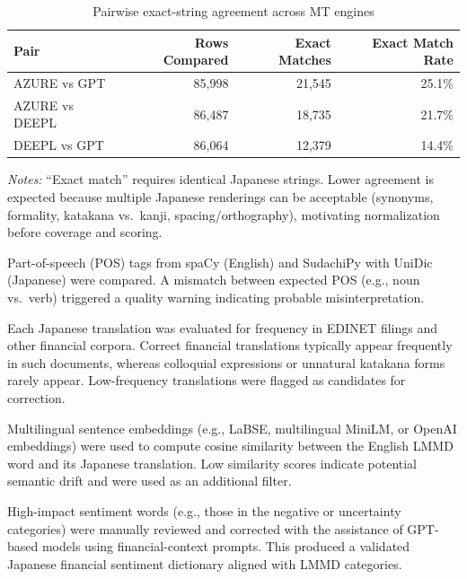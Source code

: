 \begin{table}[htbp]
\centering
\small
\caption{Pairwise exact-string agreement across MT engines}
\label{tab:lmmd_pairwise_agreement}
\begin{tabular}{lrrr}
\toprule
\textbf{Pair} & \textbf{Rows Compared} & \textbf{Exact Matches} & \textbf{Exact Match Rate} \\
\midrule
AZURE vs GPT   & 85,998 & 21,545 & 25.1\% \\
AZURE vs DEEPL & 86,487 & 18,735 & 21.7\% \\
DEEPL vs GPT   & 86,064 & 12,379 & 14.4\% \\
\bottomrule
\end{tabular}

\vspace{4pt}
\begin{minipage}{0.95\linewidth}
\footnotesize
\emph{Notes:} “Exact match” requires identical Japanese strings. Lower agreement is expected because multiple Japanese renderings can be acceptable (synonyms, formality, katakana vs.\ kanji, spacing/orthography), motivating normalization before coverage and scoring.
\end{minipage}
\end{table}

Part-of-speech (POS) tags from spaCy (English) and SudachiPy with UniDic (Japanese) were compared. 
A mismatch between expected POS (e.g., noun vs.\ verb) triggered a quality warning indicating probable misinterpretation.

Each Japanese translation was evaluated for frequency in EDINET filings and other financial corpora. 
Correct financial translations typically appear frequently in such documents, whereas colloquial expressions or unnatural katakana forms rarely appear. 
Low-frequency translations were flagged as candidates for correction.

Multilingual sentence embeddings (e.g., LaBSE, multilingual MiniLM, or OpenAI embeddings) were used to compute cosine similarity between the English LMMD word and its Japanese translation. 
Low similarity scores indicate potential semantic drift and were used as an additional filter.

High-impact sentiment words (e.g., those in the negative or uncertainty categories) were manually reviewed and corrected with the assistance of GPT-based models using financial-context prompts. 
This produced a validated Japanese financial sentiment dictionary aligned with LMMD categories.

